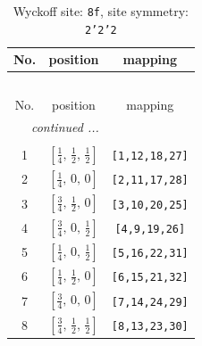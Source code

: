 \documentclass[fleqn,8pt]{jsarticle}
\begin{document}
\begin{longtable}{ccc}
\caption{Wyckoff site: {\tt 8f}, site symmetry: {\tt 2'2'2}}
 \\
 \hline \hline
No. & position & mapping \\ \hline \endfirsthead

\multicolumn{2}{l}{\tablename\ \thetable{}} \\
 \hline \hline
No. & position & mapping \\ \hline \endhead

 \hline \hline
\multicolumn{2}{r}{\footnotesize\it continued ...} \\ \endfoot

 \hline \hline
\multicolumn{2}{r}{} \\ \endlastfoot

1 & $\left[ \frac{1}{4},\, \frac{1}{2},\, \frac{1}{2} \right]$ & {\tt [1,12,18,27]} \\ \hline
2 & $\left[ \frac{1}{4},\, 0,\, 0 \right]$ & {\tt [2,11,17,28]} \\ \hline
3 & $\left[ \frac{3}{4},\, \frac{1}{2},\, 0 \right]$ & {\tt [3,10,20,25]} \\ \hline
4 & $\left[ \frac{3}{4},\, 0,\, \frac{1}{2} \right]$ & {\tt [4,9,19,26]} \\ \hline
5 & $\left[ \frac{1}{4},\, 0,\, \frac{1}{2} \right]$ & {\tt [5,16,22,31]} \\ \hline
6 & $\left[ \frac{1}{4},\, \frac{1}{2},\, 0 \right]$ & {\tt [6,15,21,32]} \\ \hline
7 & $\left[ \frac{3}{4},\, 0,\, 0 \right]$ & {\tt [7,14,24,29]} \\ \hline
8 & $\left[ \frac{3}{4},\, \frac{1}{2},\, \frac{1}{2} \right]$ & {\tt [8,13,23,30]} \\
\end{longtable}
\renewcommand{\arraystretch}{1.2}
\end{document}
